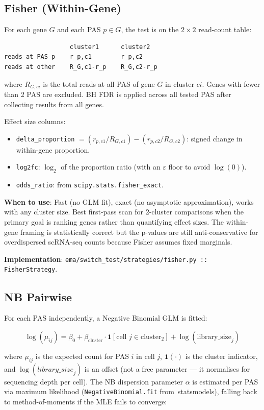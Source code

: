 \documentclass[11pt,a4paper]{article}
\begin{document}
\subsection{Fisher (Within-Gene)}

For each gene $G$ and each PAS $p \in G$, the test is on the $2{\times}2$ read-count
table:

\begin{lstlisting}
                  cluster1      cluster2
reads at PAS p    r_p,c1        r_p,c2
reads at other    R_G,c1-r_p    R_G,c2-r_p
\end{lstlisting}

where $R_{G,ci}$ is the total reads at all PAS of gene $G$ in cluster $ci$. Genes
with fewer than 2 PAS are excluded. BH FDR is applied across all tested PAS after
collecting results from all genes.

Effect size columns:
\begin{itemize}
  \item \texttt{delta\_proportion} $= (r_{p,c1}/R_{G,c1}) - (r_{p,c2}/R_{G,c2})$:
        signed change in within-gene proportion.
  \item \texttt{log2fc}: $\log_2$ of the proportion ratio (with an $\varepsilon$ floor
        to avoid $\log(0)$).
  \item \texttt{odds\_ratio}: from \texttt{scipy.stats.fisher\_exact}.
\end{itemize}

\textbf{When to use}: Fast (no GLM fit), exact (no asymptotic approximation), works
with any cluster size. Best first-pass scan for 2-cluster comparisons when the primary
goal is ranking genes rather than quantifying effect sizes. The within-gene framing is
statistically correct but the p-values are still anti-conservative for overdispersed
scRNA-seq counts because Fisher assumes fixed marginals.

\textbf{Implementation}: \texttt{ema/switch\_test/strategies/fisher.py :: FisherStrategy}.

\subsection{NB Pairwise}

For each PAS independently, a Negative Binomial GLM is fitted:

\[
  \log(\mu_{ij}) = \beta_0 + \beta_{\text{cluster}} \cdot \mathbf{1}[\text{cell } j \in \text{cluster}_2] + \log(\text{library\_size}_j)
\]

where $\mu_{ij}$ is the expected count for PAS $i$ in cell $j$, $\mathbf{1}(\cdot)$
is the cluster indicator, and $\log(\textit{library\_size}_j)$ is an offset (not a free
parameter --- it normalises for sequencing depth per cell). The NB dispersion
parameter $\alpha$ is estimated per PAS via maximum likelihood
(\texttt{NegativeBinomial.fit} from~statsmodels), falling back to method-of-moments if
the MLE fails to converge:
\end{document}
